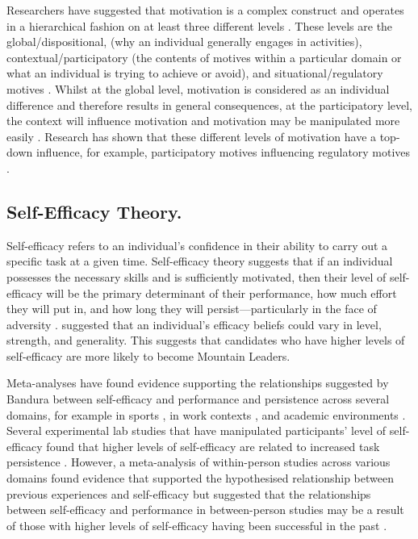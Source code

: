 \documentclass[
  12pt,
  a4paper,
]{book}
\begin{document}
Researchers have suggested that motivation is a complex construct and operates in a hierarchical fashion on at least three different levels \citep{Ingledew2009, Vallerand1997, Vallerand2002}. These levels are the global/dispositional, (why an individual generally engages in activities), contextual/participatory (the contents of motives within a particular domain or what an individual is trying to achieve or avoid), and situational/regulatory motives \citep[the perceived locus of causality of the behavioural goals---where the motive sits on the relative autonomy continuum;][]{Deci2000, Ingledew2009, Vallerand1997, Vallerand2002}. Whilst at the global level, motivation is considered as an individual difference and therefore results in general consequences, at the participatory level, the context will influence motivation and motivation may be manipulated more easily \citep{Vallerand2002}. \citet{Ingledew2009} Research has shown that these different levels of motivation have a top-down influence, for example, participatory motives influencing regulatory motives \citep{Ingledew2009}.

\hypertarget{gen-intro-self-efficacy}{%
\subsection{Self-Efficacy Theory.}\label{gen-intro-self-efficacy}}

Self-efficacy refers to an individual's confidence in their ability to carry out a specific task at a given time. Self-efficacy theory suggests that if an individual possesses the necessary skills and is sufficiently motivated, then their level of self-efficacy will be the primary determinant of their performance, how much effort they will put in, and how long they will persist---particularly in the face of adversity \citep{Bandura1977, Bandura1982, Bandura1997}. \citet{Bandura1977} suggested that an individual's efficacy beliefs could vary in level, strength, and generality. This suggests that candidates who have higher levels of self-efficacy are more likely to become Mountain Leaders.

Meta-analyses have found evidence supporting the relationships suggested by Bandura between self-efficacy and performance and persistence across several domains, for example in sports \citep{Moritz2000}, in work contexts \citep{Stajkovic1998}, and academic environments \citep{Multon1991}. Several experimental lab studies that have manipulated participants' level of self-efficacy found that higher levels of self-efficacy are related to increased task persistence \citep{Hutchinson2008, Tenenbaum2001, Weinberg1979, Weinberg1980, Weinberg1981}. However, a meta-analysis of within-person studies across various domains found evidence that supported the hypothesised relationship between previous experiences and self-efficacy but suggested that the relationships between self-efficacy and performance in between-person studies may be a result of those with higher levels of self-efficacy having been successful in the past \citep{Sitzmann2013}.
\end{document}
